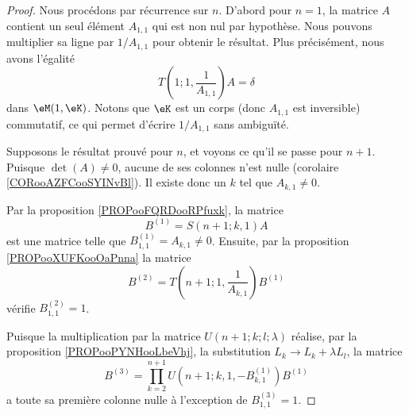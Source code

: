 \begin{proof}
	Nous procédons par récurrence sur \( n\). D'abord pour \( n=1\), la matrice \( A\) contient un seul élément \( A_{1,1}\) qui est non nul par hypothèse. Nous pouvons multiplier sa ligne par \( 1/A_{1,1}\) pour obtenir le résultat. Plus précisément, nous avons l'égalité
	\begin{equation}
		T(1;1,\frac{1}{ A_{1,1} })A=\delta
	\end{equation}
	dans \( \eM(1, \eK)\). Notons que \( \eK\) est un corps (donc \( A_{1,1}\) est inversible) commutatif, ce qui permet d'écrire \( 1/A_{1,1}\) sans ambiguïté.

	Supposons le résultat prouvé pour \( n\), et voyons ce qu'il se passe pour \( n+1\). Puisque \( \det(A)\neq 0\), aucune de ses colonnes n'est nulle (corolaire \ref{CORooAZFCooSYINvBl}). Il existe donc un \( k\) tel que \( A_{k,1}\neq 0\).

	Par la proposition \ref{PROPooFQRDooRPfuxk}, la matrice
	\begin{equation}
		B^{(1)}=S(n+1;k,1)A
	\end{equation}
	est une matrice telle que \( B^{(1)}_{1,1}=A_{k,1}\neq 0\). Ensuite, par la proposition \ref{PROPooXUFKooOaPnna} la matrice
	\begin{equation}
		B^{(2)}=T(n+1;1,\frac{1}{ A_{k,1} })B^{(1)}
	\end{equation}
	vérifie \( B^{(2)}_{1,1}=1\).

	Puisque la multiplication par la matrice \( U(n+1;k;l;\lambda)\) réalise, par la proposition \ref{PROPooPYNHooLbeVhj}, la substitution \( L_k\to L_{k}+\lambda L_l\), la matrice
	\begin{equation}
		B^{(3)}=\prod_{k=2}^{n+1} U(n+1;k,1,-B^{(1)}_{k,1})B^{(1)}
	\end{equation}
	a toute sa première colonne nulle à l'exception de \( B^{(3)}_{1,1}=1\).


\end{proof}
